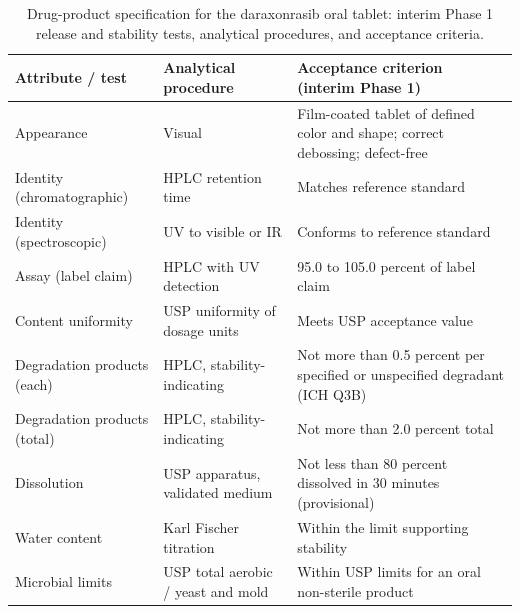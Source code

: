 \begin{table}[t]
\centering
\caption{Drug-product specification for the daraxonrasib oral tablet: interim
Phase 1 release and stability tests, analytical procedures, and acceptance
criteria.}
\label{tab:cmc-dp-spec}
\begin{tabularx}{\textwidth}{L{4.0cm} L{4.0cm} Y}
\toprule
\textbf{Attribute / test} & \textbf{Analytical procedure} & \textbf{Acceptance criterion (interim Phase 1)} \\
\midrule
Appearance & Visual & Film-coated tablet of defined color and shape; correct debossing; defect-free \\
Identity (chromatographic) & HPLC retention time & Matches reference standard \\
Identity (spectroscopic) & UV to visible or IR & Conforms to reference standard \\
Assay (label claim) & HPLC with UV detection & 95.0 to 105.0 percent of label claim \\
Content uniformity & USP uniformity of dosage units & Meets USP acceptance value \\
Degradation products (each) & HPLC, stability-indicating & Not more than 0.5 percent per specified or unspecified degradant (ICH Q3B) \\
Degradation products (total) & HPLC, stability-indicating & Not more than 2.0 percent total \\
Dissolution & USP apparatus, validated medium & Not less than 80 percent dissolved in 30 minutes (provisional) \\
Water content & Karl Fischer titration & Within the limit supporting stability \\
Microbial limits & USP total aerobic / yeast and mold & Within USP limits for an oral non-sterile product \\
\bottomrule
\end{tabularx}
\vspace*{-0.2cm}
\end{table}

